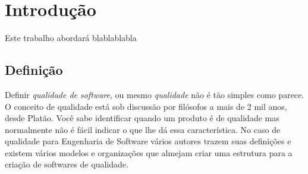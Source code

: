 \documentclass[
	12pt,				%
	openright,			%
	twoside,			%
	a4paper,			%
	english,			%
	brazil,				%
	]{abntex2}
\begin{document}

\tableofcontents*
\cleardoublepage



\textual

\chapter[Introdução]{Introdução}

Este trabalho abordará blablablabla %

\section{Definição}

Definir \emph{qualidade de software}, ou mesmo \emph{qualidade} não é tão simples como parece. O conceito de qualidade está sob discussão por filósofos a mais de 2 mil anos, desde Platão. Você sabe identificar quando um produto é de qualidade mas normalmente não é fácil indicar o que lhe dá essa característica. No caso de qualidade para Engenharia de Software vários autores trazem suas definições e existem vários modelos e organizações que almejam criar uma estrutura para a criação de softwares de qualidade.
\end{document}
